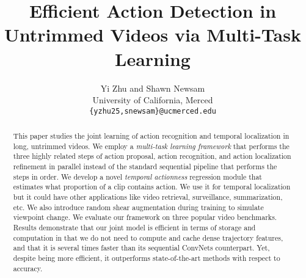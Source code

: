 \documentclass[10pt,twocolumn,letterpaper]{article}
\begin{document}
\title{Efficient Action Detection in Untrimmed Videos via Multi-Task Learning}

\author{Yi Zhu and Shawn Newsam\\
University of California, Merced\\
{\tt\small \{yzhu25,snewsam\}@ucmerced.edu}
}

\maketitle
\ifwacvfinal\thispagestyle{empty}\fi

\begin{abstract}
	This paper studies the joint learning of action recognition and temporal localization in long, untrimmed videos. We employ a \textit{ multi-task learning framework} that performs the three highly related steps of action proposal, action recognition, and action localization refinement in parallel instead of the standard sequential pipeline that performs the steps in order. 
	We develop a novel \textit{temporal actionness} regression module that estimates what proportion of a clip contains action. We use it for temporal localization but it could have other applications like video retrieval, surveillance, summarization, etc. 
	We also introduce random shear augmentation during training to simulate viewpoint change.
	We evaluate our framework on three popular video benchmarks. Results demonstrate that our joint model is efficient in terms of storage and computation in that we do not need to compute and cache dense trajectory features, and that it is several times faster than its sequential ConvNets counterpart. Yet, despite being more efficient, it outperforms state-of-the-art methods with respect to accuracy.
\end{abstract}
\end{document}
